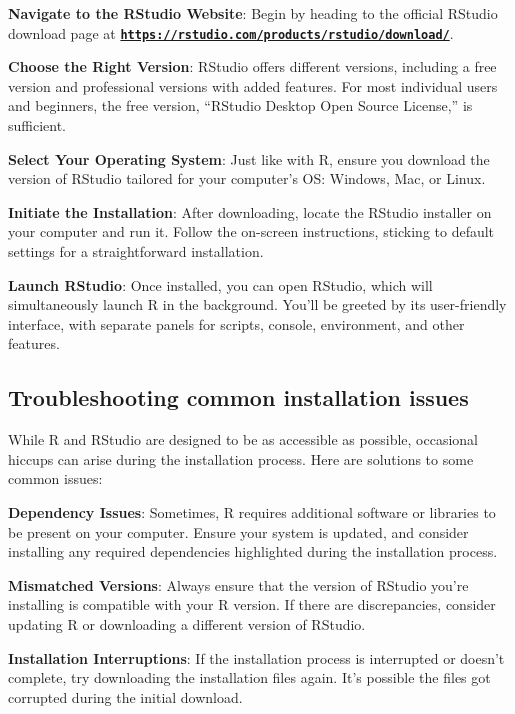 \documentclass[
  b5paper]{book}
\begin{document}
\textbf{Navigate to the RStudio Website}: Begin by heading to the official RStudio download page at \href{https://rstudio.com/products/rstudio/download/}{\textbf{\texttt{https://rstudio.com/products/rstudio/download/}}}.

\textbf{Choose the Right Version}: RStudio offers different versions, including a free version and professional versions with added features. For most individual users and beginners, the free version, ``RStudio Desktop Open Source License,'' is sufficient.

\textbf{Select Your Operating System}: Just like with R, ensure you download the version of RStudio tailored for your computer's OS: Windows, Mac, or Linux.

\textbf{Initiate the Installation}: After downloading, locate the RStudio installer on your computer and run it. Follow the on-screen instructions, sticking to default settings for a straightforward installation.

\textbf{Launch RStudio}: Once installed, you can open RStudio, which will simultaneously launch R in the background. You'll be greeted by its user-friendly interface, with separate panels for scripts, console, environment, and other features.

\hypertarget{troubleshooting-common-installation-issues}{%
\subsection*{Troubleshooting common installation issues}\label{troubleshooting-common-installation-issues}}

While R and RStudio are designed to be as accessible as possible, occasional hiccups can arise during the installation process. Here are solutions to some common issues:

\textbf{Dependency Issues}: Sometimes, R requires additional software or libraries to be present on your computer. Ensure your system is updated, and consider installing any required dependencies highlighted during the installation process.

\textbf{Mismatched Versions}: Always ensure that the version of RStudio you're installing is compatible with your R version. If there are discrepancies, consider updating R or downloading a different version of RStudio.

\textbf{Installation Interruptions}: If the installation process is interrupted or doesn't complete, try downloading the installation files again. It's possible the files got corrupted during the initial download.
\end{document}
